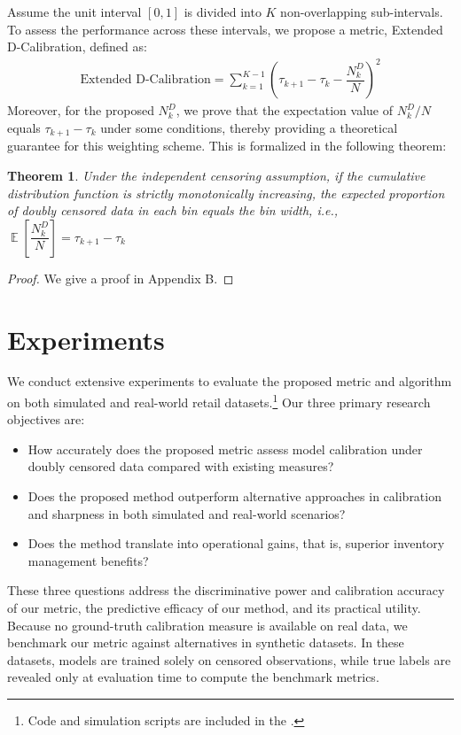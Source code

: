 \documentclass[sigconf]{acmart}
\newtheorem{theorem}{Theorem}
\begin{document}
Assume the unit interval $[0,1]$ is divided into $K$ non-overlapping sub-intervals. To assess the performance across these intervals, we propose a metric, Extended D-Calibration, defined as:
\begin{align*}
    \text{Extended D-Calibration} = \sum_{k = 1}^{K-1}(\tau_{k+1} - \tau_k - \dfrac{N^{D}_k}{N})^2
\end{align*}
Moreover, for the proposed $N^{D}_k$, we prove that the expectation value of $N^{D}_k/N$ equals $\tau_{k+1} - \tau_k$ under some conditions, thereby providing a theoretical guarantee for this weighting scheme. This is formalized in the following theorem:
\begin{theorem}
\label{thm:exp-dcal}
Under the independent censoring assumption, if the cumulative distribution function is strictly monotonically increasing, the expected proportion of doubly censored data in each bin equals the bin width, i.e., $\mathop{\mathbb{E}}[\dfrac{N^{D}_k}{N}] = \tau_{k+1} - \tau_{k} $
\end{theorem}
\begin{proof}
We give a proof in Appendix B.
\end{proof}


\section{Experiments}
We conduct extensive experiments to evaluate the proposed metric and algorithm on both simulated and real-world retail datasets.\footnote{Code and simulation scripts are included in the \href{https://github.com/ZiwenYeee/Framework4DoublyCensoredData}{\color{blue}{link}}.} Our three primary research objectives are:
\begin{itemize}
    \item How accurately does the proposed metric assess model calibration under doubly censored data compared with existing measures?
    \item Does the proposed method outperform alternative approaches in calibration and sharpness in both simulated and real-world scenarios?
    \item Does the method translate into operational gains, that is, superior inventory management benefits?
\end{itemize}
These three questions address the discriminative power and calibration accuracy of our metric, the predictive efficacy of our method, and its practical utility. Because no ground-truth calibration measure is available on real data, we benchmark our metric against alternatives in synthetic datasets. In these datasets, models are trained solely on censored observations, while true labels are revealed only at evaluation time to compute the benchmark metrics.
\end{document}
